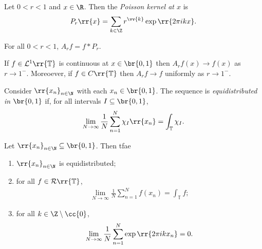 \documentclass{article}
\begin{document}
\begin{definition}
  Let $0<r<1$ and $x\in\R$. Then the \emph{Poisson kernel at $x$} is
  \begin{align*}
    P_r\rr{x}= \sum_{k\in\Z} r^{\vv{k}}\exp\rr{2\pi ikx}.
  \end{align*}
\end{definition}

\begin{proposition}
  For all $0<r<1$, $A_r f = f * P_r$.
\end{proposition}

\begin{theorem}
  If $f\in\mathcal L^1\rr{\mathbb T}$ is continuous at $x\in\br{0,1}$ then $A_r f(x)\to f(x)$
  as $r\to 1^-$. Moreoever, if $f\in C\rr{\mathbb T}$ then $A_r f\to f$ uniformly as
  $r\to 1^-$.
\end{theorem}

\begin{definition}
  Consider $\rr{x_n}_{n\in\N}$ with each $x_n\in\br{0,1}$. The sequence is \emph{equidistributed
  in $\br{0,1}$} if, for all intervals $I\subseteq \br{0,1}$,
  \begin{align*}
    \lim_{N\to\infty} \frac{1}{N}\sum_{n=1}^N \chi_I\rr{x_n} = \int_{\mathbb T}\chi_I.
  \end{align*}
\end{definition}

\begin{theorem}
  Let $\rr{x_n}_{n\in\N}\subseteq\br{0,1}$. Then tfae
  \begin{enumerate}
    \item $\rr{x_n}_{n\in\N}$ is equidistributed;
    \item for all $f\in\mathcal R\rr{\mathbb T}$,
      \begin{align*}
        \lim_{N\to\infty}\frac{1}{N}\sum_{n=1}^N f(x_n) = \int_{\mathbb T} f;
      \end{align*}
    \item for all $k\in\Z\setminus\cc{0}$,
      \begin{align*}
        \lim_{N\to\infty} \frac{1}{N}\sum_{n=1}^{N} \exp\rr{2\pi ikx_n}=0.
      \end{align*}
  \end{enumerate}
\end{theorem}
\end{document}
